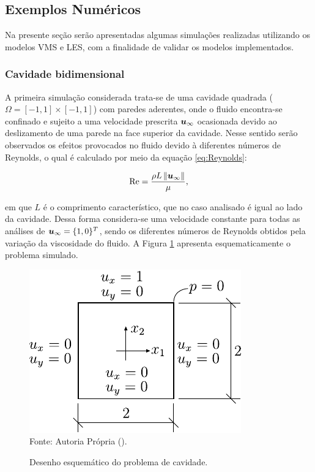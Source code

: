 \subsection{Exemplos Numéricos} \label{ExemplosMT}

Na presente seção serão apresentadas algumas simulações realizadas utilizando os modelos VMS e LES, com a finalidade de validar os modelos implementados.

\subsubsection{Cavidade bidimensional}

A primeira simulação considerada trata-se de uma cavidade quadrada ($\Omega=[-1,1]\times[-1,1]$) com paredes aderentes, onde o fluido encontra-se confinado e sujeito a uma velocidade prescrita $\boldsymbol{u}_\infty$ ocasionada devido ao deslizamento de uma parede na face superior da cavidade. Nesse sentido serão observados os efeitos provocados no fluido devido à diferentes números de Reynolds, o qual é calculado por meio da equação \ref{eq:Reynolds}:

\begin{equation}
    \mathrm{Re}=\frac{\rho L\left\lVert{\boldsymbol{u}_\infty}\right\lVert}{\mu}\text{,}
    \label{eq:Reynolds}
\end{equation}

\noindent em que $L$ é o comprimento característico, que no caso analisado é igual ao lado da cavidade. Dessa forma considera-se uma velocidade constante para todas as análises de $\boldsymbol{u}_\infty=\{1,0\}^T$, sendo os diferentes números de Reynolds obtidos pela variação da viscosidade do fluido. A Figura \ref{fig:cavity} apresenta esquematicamente o problema simulado.

\begin{figure}[h]
    \centering
    \caption{Desenho esquemático do problema de cavidade.}
    \includegraphics[width=.35\linewidth]{Figuras/Cavity/cavidade.pdf}
    \\Fonte: Autoria Própria (\the\year).
    \label{fig:cavity}
\end{figure}


